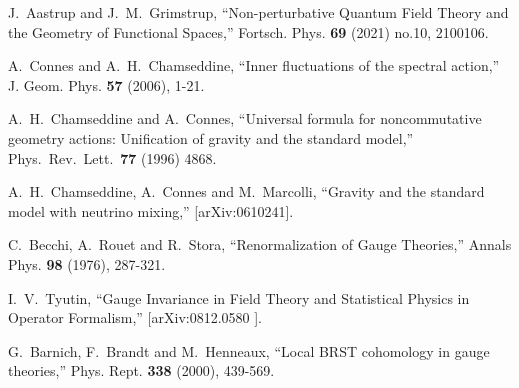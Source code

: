 \documentclass[letterpaper,11pt]{article}
\begin{document}
\begin{thebibliography}{99}
J.~Aastrup and J.~M.~Grimstrup,
``Non-perturbative Quantum Field Theory and the Geometry of Functional Spaces,''
Fortsch. Phys. \textbf{69} (2021) no.10, 2100106.









A.~Connes and A.~H.~Chamseddine,
``Inner fluctuations of the spectral action,''
J. Geom. Phys. \textbf{57} (2006), 1-21.




A.~H.~Chamseddine and A.~Connes,
``Universal formula for noncommutative geometry actions: Unification of
gravity and the standard model,''
Phys.\ Rev.\ Lett.\  {\bf 77} (1996) 4868.








  A.~H.~Chamseddine, A.~Connes and M.~Marcolli,
  ``Gravity and the standard model with neutrino mixing,''
  [arXiv:0610241].





C.~Becchi, A.~Rouet and R.~Stora,
``Renormalization of Gauge Theories,''
Annals Phys. \textbf{98} (1976), 287-321.




I.~V.~Tyutin,
``Gauge Invariance in Field Theory and Statistical Physics in Operator Formalism,''
[arXiv:0812.0580 ].

G.~Barnich, F.~Brandt and M.~Henneaux,
``Local BRST cohomology in gauge theories,''
Phys. Rept. \textbf{338} (2000), 439-569.


\end{thebibliography}
\end{document}
